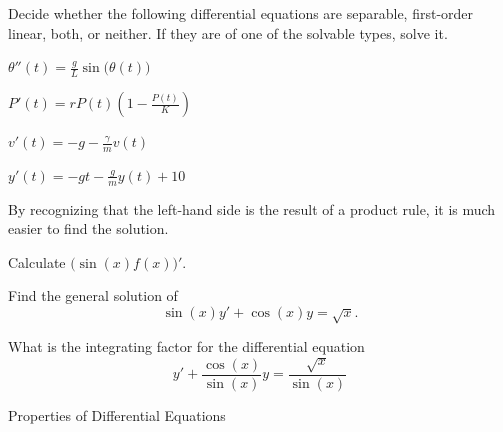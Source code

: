 \question 
	Decide whether the following differential equations are separable, first-order linear, both, or neither. If they are of one of the solvable types, solve it.

\begin{parts}
	\item $\displaystyle\theta''(t) = \frac{g}{L} \sin\big(\theta(t)\big)$
	\item $\displaystyle P'(t) = r P(t) \left( 1 - \frac{P(t)}{K} \right)$
	\item $\displaystyle v'(t) = -g - \frac{\gamma}{m} v(t)$
	\item $\displaystyle y'(t) = -gt - \frac{g}{m} y(t) + 10$
\end{parts}











\bookonlynewpage




\begin{annotation}
\begin{goals}
	By recognizing that the left-hand side is the result of a product rule, it is much easier to find the solution.
\end{goals}
\end{annotation}
\question
\begin{parts}
	\item Calculate $\big( \sin(x) f(x) \big)'$.
	\item Find the general solution of 
		$$ \sin(x) y' + \cos(x) y = \sqrt{x}.$$
	\item What is the integrating factor for the differential equation
		$$ y' + \frac{\cos(x)}{\sin(x)} y = \frac{\sqrt{x}}{\sin(x)}$$
\end{parts}









%
%

\standardonlynewpage





\begin{module}{Properties of Differential Equations}
	\label{ODE:properties}

	
	






\end{module}



